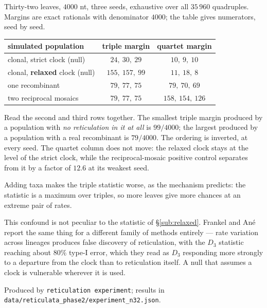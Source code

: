\begin{numerics}
Thirty-two leaves, $4000$ nt, three seeds, exhaustive over all $35\,960$
quadruples. Margins are exact rationals with denominator $4000$; the table gives
numerators, seed by seed.

\begin{center}\small
\begin{tabular}{@{}lcc@{}}
\toprule
simulated population & triple margin & quartet margin \\
\midrule
clonal, strict clock (null)            & $24,\ 30,\ 29$     & $10,\ 9,\ 10$ \\
clonal, \textbf{relaxed} clock (null)  & $155,\ 157,\ 99$   & $11,\ 18,\ 8$ \\
one recombinant                        & $79,\ 77,\ 75$     & $79,\ 70,\ 69$ \\
two reciprocal mosaics                 & $79,\ 77,\ 75$     & $158,\ 154,\ 126$ \\
\bottomrule
\end{tabular}
\end{center}

Read the second and third rows together. The smallest triple margin produced by
a population with \emph{no reticulation in it at all} is $99/4000$; the largest
produced by a population with a real recombinant is $79/4000$. The ordering is
inverted, at every seed. The quartet column does not move: the relaxed clock
stays at the level of the strict clock, while the reciprocal-mosaic positive
control separates from it by a factor of $12.6$ at its weakest seed.

Adding taxa makes the triple statistic worse, as the mechanism predicts: the
statistic is a maximum over triples, so more leaves give more chances at an
extreme pair of rates.

This confound is not peculiar to the statistic of \S\ref{sub:relaxed}. Frankel
and Ané report the same thing for a different family of methods entirely ---
rate variation across lineages produces false discovery of reticulation, with
the $D_3$ statistic reaching about $80\%$ type-I error, which they read as $D_3$
responding more strongly to a departure from the clock than to reticulation
itself. A null that assumes a clock is vulnerable wherever it is used.

Produced by \texttt{reticulation experiment}; results in
\texttt{data/reticulata\_phase2/experiment\_n32.json}.
\end{numerics}

